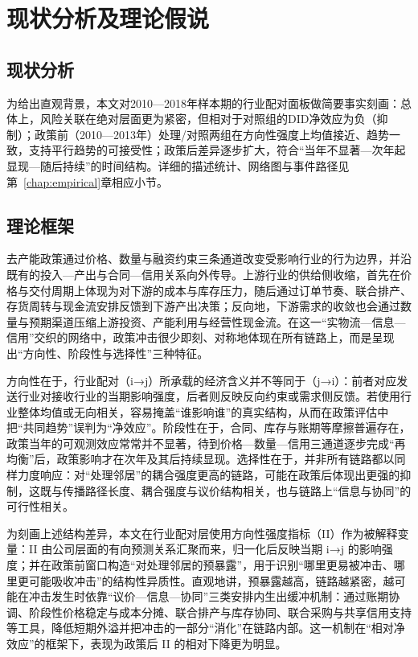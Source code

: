 \chapter{现状分析及理论假说}
\label{chap:theory}

\section{现状分析}
为给出直观背景，本文对2010—2018年样本期的行业配对面板做简要事实刻画：总体上，风险关联在绝对层面更为紧密，但相对于对照组的DID净效应为负（抑制）；政策前（2010—2013年）处理/对照两组在方向性强度上均值接近、趋势一致，支持平行趋势的可接受性；政策后差异逐步扩大，符合“当年不显著—次年起显现—随后持续”的时间结构。详细的描述统计、网络图与事件路径见第~\ref{chap:empirical}章相应小节。

\section{理论框架}
去产能政策通过价格、数量与融资约束三条通道改变受影响行业的行为边界，并沿既有的投入—产出与合同—信用关系向外传导。上游行业的供给侧收缩，首先在价格与交付周期上体现为对下游的成本与库存压力，随后通过订单节奏、联合排产、存货周转与现金流安排反馈到下游产出决策；反向地，下游需求的收敛也会通过数量与预期渠道压缩上游投资、产能利用与经营性现金流。在这一“实物流—信息—信用”交织的网络中，政策冲击很少即刻、对称地体现在所有链路上，而是呈现出“方向性、阶段性与选择性”三种特征。

方向性在于，行业配对（i→j）所承载的经济含义并不等同于（j→i）：前者对应发送行业对接收行业的当期影响强度，后者则反映反向约束或需求侧反馈。若使用行业整体均值或无向相关，容易掩盖“谁影响谁”的真实结构，从而在政策评估中把“共同趋势”误判为“净效应”。阶段性在于，合同、库存与账期等摩擦普遍存在，政策当年的可观测效应常常并不显著，待到价格—数量—信用三通道逐步完成“再均衡”后，政策影响才在次年及其后持续显现。选择性在于，并非所有链路都以同样力度响应：对“处理邻居”的耦合强度更高的链路，可能在政策后体现出更强的抑制，这既与传播路径长度、耦合强度与议价结构相关，也与链路上“信息与协同”的可行性相关。

为刻画上述结构差异，本文在行业配对层使用方向性强度指标（II）作为被解释变量：II 由公司层面的有向预测关系汇聚而来，归一化后反映当期 i→j 的影响强度；并在政策前窗口构造“对处理邻居的预暴露”，用于识别“哪里更易被冲击、哪里更可能吸收冲击”的结构性异质性。直观地讲，预暴露越高，链路越紧密，越可能在冲击发生时依靠“议价—信息—协同”三类安排内生出缓冲机制：通过账期协调、阶段性价格稳定与成本分摊、联合排产与库存协同、联合采购与共享信用支持等工具，降低短期外溢并把冲击的一部分“消化”在链路内部。这一机制在“相对净效应”的框架下，表现为政策后 II 的相对下降更为明显。

